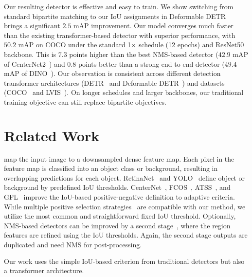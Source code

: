 \documentclass[10pt,twocolumn,letterpaper]{article}
\newcommand{\myparagraph}[1]{\vspace{2pt}\noindent{\textbf{#1}}}
\newcommand{\nmsdets}{{NMS-based detectors\xspace}}
\begin{document}
Our resulting detector is effective and easy to train.
We show switching from standard bipartite matching to our IoU assignments in Deformable DETR~\cite{zhu2020deformable} brings a significant $2.5$ mAP improvement.
Our model converges much faster than the existing transformer-based detector with superior performance, with $50.2$ mAP on COCO under the standard 1$\times$ schedule (12 epochs) and ResNet50 backbone.
This is $7.3$ points higher than the best NMS-based detector ($42.9$ mAP of CenterNet2~\cite{zhou2021probablistic}) and $0.8$ points better than a strong end-to-end detector ($49.4$ mAP of DINO~\cite{zhang2022dino}).
Our observation is consistent across different detection transformer architectures (DETR~\cite{carion2020end} and Deformable DETR~\cite{zhu2020deformable}) and datasets (COCO~\cite{lin2014coco} and LVIS~\cite{gupta2019lvis}).
On longer schedules and larger backbones, our traditional training objective can still replace bipartite objectives.


\section{Related Work}


\myparagraph{Traditional \nmsdets} map the input image to a downsampled dense feature map.
Each pixel in the feature map is classified into an object class or background, resulting in overlapping predictions for each object.
RetinaNet~\cite{lin2017focal} and YOLO~\cite{redmon2016you,redmon2017yolo9000,redmon2018yolov3} define object or background by predefined IoU thresholds.
CenterNet~\cite{zhou2019objects}, FCOS~\cite{tian2019fcos}, ATSS~\cite{zhang2020bridging}, and GFL~\cite{li2020generalized} improve the IoU-based positive-negative definition to adaptive criteria.
While multiple positive selection strategies~\cite{zhang2020bridging,chen2021you} are compatible with our method, we utilize the most common and straightforward fixed IoU threshold.
Optionally, NMS-based detectors can be improved by a second stage~\cite{ren2015faster,he2017mask,cai2018cascade,chen2019hybrid,zhou2021probablistic}, 
where the region features are refined using the IoU thresholds.
Again, the second stage outputs are duplicated and need NMS for post-processing.

Our work uses the simple IoU-based criterion from traditional detectors but also a transformer architecture.
\end{document}
